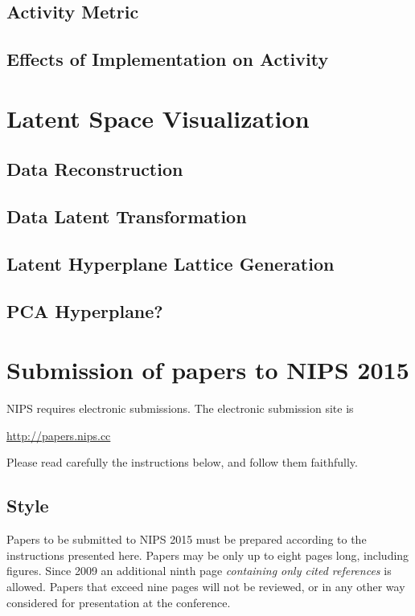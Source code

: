 \documentclass{article} %
\begin{document}
\subsection{Activity Metric}
\subsection{Effects of Implementation on Activity}

\section{Latent Space Visualization}
\subsection{Data Reconstruction}
\subsection{Data Latent Transformation}
\subsection{Latent Hyperplane Lattice Generation}
\subsection{PCA Hyperplane?}








\section{Submission of papers to NIPS 2015}

NIPS requires electronic submissions.  The electronic submission site is  
\begin{center}
   \url{http://papers.nips.cc}
\end{center}

Please read carefully the
instructions below, and follow them faithfully.
\subsection{Style}

Papers to be submitted to NIPS 2015 must be prepared according to the
instructions presented here. Papers may be only up to eight pages long,
including figures. Since 2009 an additional ninth page \textit{containing only
cited references} is allowed. Papers that exceed nine pages will not be
reviewed, or in any other way considered for presentation at the conference.
\end{document}

